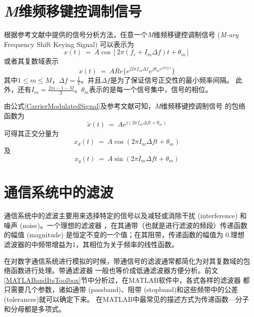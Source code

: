  \section{\emph{M}维频移键控调制信号}
根据参考文献中提供的信号分析方法，任意一个\emph{M}维频移键控调制信号
 (\emph{M-ary} Frequency Shift Keying Signal) 可以表示为
 \begin{equation}%
    x(t) ~=~ A\cos[2\pi(f_{c}+I_{m}\Delta f)t+\theta_{m}]
 \end{equation}
 或者其复数域表示
 \begin{equation}%
    x(t) ~=~ ARe\{e^{j2\pi f_{m}\Delta f}e^{j\theta_{m}e^{j2\pi f_{c}t}}\}
 \end{equation}
 其中$1 \leq m \leq M$，$\Delta f = \frac{1}{T}$。并且$\Delta f$是为了保证信号正交性的最小频率间隔。
 此外，还有$I_{m} = \frac{2m-1-M}{2}$。$\theta_{m}$表示的是每一个信号集中，信号的相位。
 \par
 由公式\eqref{CarrierModulatedSignal}及参考文献可知，\emph{M}维频移键控调制信号
 的包络函数为
 \begin{equation}%
    \tilde{x}(t) ~=~ Ae^{j(2\pi f_{m}\Delta ft+\theta_{m})}
 \end{equation}
 可得其正交分量为
 \begin{equation}%
    x_{d}(t) ~=~ A\cos(2\pi I_{m}\Delta ft+\theta_{m})
 \end{equation}
 及
 \begin{equation}%
    x_{q}(t) ~=~ A\sin(2\pi I_{m}\Delta ft+\theta_{m})
 \end{equation}

 \section{通信系统中的滤波}
 通信系统中的滤波主要用来选择特定的信号以及减轻或消除干扰 (interference) 和噪声 (noise)。一个理想的滤波器
 ，在其通带（也就是进行滤波的频段）传递函数的幅值 (magnitude) 是恒定不变的一个值；在其阻带，传递函数的幅值为
 0.理想滤波器的中频带增益为1，其相位为关于频率的线性函数。
 \par
 在对数字通信系统进行模拟的时候，带通信号的滤波通常都简化为对其复数域的包络函数进行处理。带通滤波器
 一般也等价成低通滤波器方便分析。前文\ref{MATLABandItsToolbox}节中分析过，在MATLAB软件中，各式各样的滤波器
 都只需要几个参数，诸如通带 (passband)、阻带 (stopband)和这些频带中的公差 (tolerances)就可以确定下来。
 在MATLAB中最常见的描述方式为传递函数---分子和分母都是多项式。


